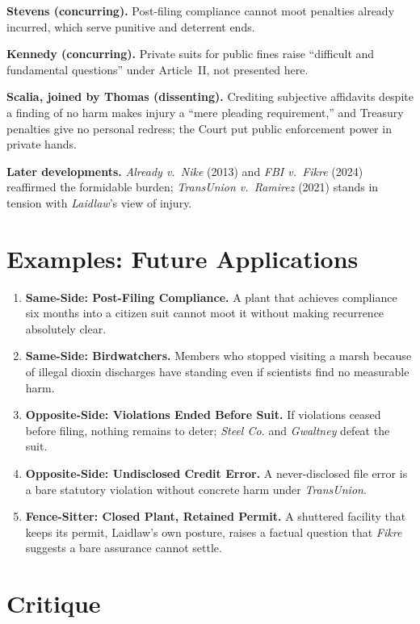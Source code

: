 \documentclass[12pt]{article}
\begin{document}
\textbf{Stevens (concurring).} Post-filing compliance cannot moot penalties already incurred, which serve punitive and deterrent ends.

\textbf{Kennedy (concurring).} Private suits for public fines raise ``difficult and fundamental questions'' under Article~II, not presented here.

\textbf{Scalia, joined by Thomas (dissenting).} Crediting subjective affidavits despite a finding of no harm makes injury a ``mere pleading requirement,'' and Treasury penalties give no personal redress; the Court put public enforcement power in private hands.

\textbf{Later developments.} \textit{Already v.\ Nike} (2013) and \textit{FBI v.\ Fikre} (2024) reaffirmed the formidable burden; \textit{TransUnion v.\ Ramirez} (2021) stands in tension with \textit{Laidlaw}'s view of injury.

\section{Examples: Future Applications}

\begin{enumerate}
\item \textbf{Same-Side: Post-Filing Compliance.} A plant that achieves compliance six months into a citizen suit cannot moot it without making recurrence absolutely clear.
\item \textbf{Same-Side: Birdwatchers.} Members who stopped visiting a marsh because of illegal dioxin discharges have standing even if scientists find no measurable harm.
\item \textbf{Opposite-Side: Violations Ended Before Suit.} If violations ceased before filing, nothing remains to deter; \textit{Steel Co.} and \textit{Gwaltney} defeat the suit.
\item \textbf{Opposite-Side: Undisclosed Credit Error.} A never-disclosed file error is a bare statutory violation without concrete harm under \textit{TransUnion}.
\item \textbf{Fence-Sitter: Closed Plant, Retained Permit.} A shuttered facility that keeps its permit, Laidlaw's own posture, raises a factual question that \textit{Fikre} suggests a bare assurance cannot settle.
\end{enumerate}

\section{Critique}
\end{document}
